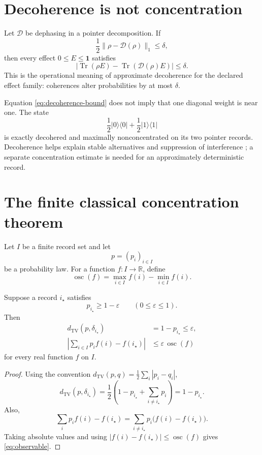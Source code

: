 \documentclass[11pt]{article}
\newcommand{\Tr}{\operatorname{Tr}}
\newcommand{\TV}{d_{\mathrm{TV}}}
\newcommand{\osc}{\operatorname{osc}}
\begin{document}
\section{Decoherence is not concentration}

Let \(\mathcal{D}\) be dephasing in a pointer decomposition. If
\[
\frac12\|\rho-\mathcal{D}(\rho)\|_1\leq\delta,
\]
then every effect \(0\leq E\leq\mathbf{1}\) satisfies
\begin{equation}
\left|
\Tr(\rho E)-\Tr(\mathcal{D}(\rho)E)
\right|
\leq\delta.
\label{eq:decoherence-bound}
\end{equation}
This is the operational meaning of approximate decoherence for the declared
effect family: coherences alter probabilities by at most \(\delta\).

Equation \eqref{eq:decoherence-bound} does not imply that one diagonal weight is
near one. The state
\[
\frac12|0\rangle\langle0|
+\frac12|1\rangle\langle1|
\]
is exactly decohered and maximally nonconcentrated on its two pointer records.
Decoherence helps explain stable alternatives and suppression of interference
\cite{Zurek2003}; a separate concentration estimate is needed for an
approximately deterministic record.

\section{The finite classical concentration theorem}

Let \(I\) be a finite record set and let
\[
p=(p_i)_{i\in I}
\]
be a probability law. For a function \(f:I\to\mathbb{R}\), define
\[
\osc(f)=\max_{i\in I}f(i)-\min_{i\in I}f(i).
\]

\begin{theorem}
Suppose a record \(i_\star\) satisfies
\[
p_{i_\star}\geq1-\varepsilon
\qquad(0\leq\varepsilon\leq1).
\]
Then
\begin{align}
\TV(p,\delta_{i_\star})
&=1-p_{i_\star}\leq\varepsilon,
\label{eq:tv}\\
\left|
\sum_{i\in I}p_i f(i)-f(i_\star)
\right|
&\leq\varepsilon\,\osc(f)
\label{eq:observable}
\end{align}
for every real function \(f\) on \(I\).
\end{theorem}

\begin{proof}
Using the convention
\(\TV(p,q)=\frac12\sum_i|p_i-q_i|\),
\[
\TV(p,\delta_{i_\star})
=\frac12\left(
1-p_{i_\star}+\sum_{i\neq i_\star}p_i
\right)
=1-p_{i_\star}.
\]
Also,
\[
\sum_i p_i f(i)-f(i_\star)
=\sum_{i\neq i_\star}
p_i\bigl(f(i)-f(i_\star)\bigr).
\]
Taking absolute values and using
\(|f(i)-f(i_\star)|\leq\osc(f)\) gives
\eqref{eq:observable}.
\end{proof}
\end{document}
